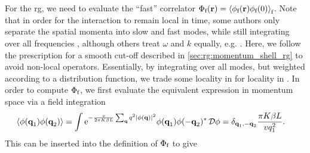 For the \tms{} \gls{rg}, we need to evaluate the ``fast'' correlator $\Phi_\f(\textbf{r}) = \bra*{\phi_\f(\textbf{r}) \phi_\f(0)}_\f$.
Note that in order for the interaction to remain local in time, some authors only separate the spatial momenta into slow and fast modes, while still integrating over all frequencies \cites[\ssec IV.B]{Bosonization_Shankar_1994}[\ssec III.A]{Bosonization_Schulz_1995}[]{Bosonization_Rao_2001}, although others treat $\omega$ and $k$ equally, e.g. \cite[\sapp E]{Giamarchi_2004}.
Here, we follow the prescription for a smooth cut-off described in \autoref{sec:rg:momentum_shell_rg} to avoid non-local operators.
Essentially, by integrating over all modes, but weighted according to a distribution function, we trade some locality in \tpspace{} for locality in \trspace{}.
In order to compute $\Phi_\f$, we first evaluate the equivalent expression in momentum space via a field integration \cite[\sapp C]{Giamarchi_2004}
\begin{align*}
\bra*{\phi(\textbf{q}_1)\phi(\textbf{q}_2)} &= \int \powe{-\frac{v}{2\pi K\beta L} \sum_\textbf{q} q^2 \abs*{\phi(\textbf{q})}^2} \phi(\textbf{q}_1) \phi(-\textbf{q}_2)^\ast \,\mathcal{D}\phi = \delta_{\textbf{q}_1,-\textbf{q}_2} \frac{\pi K\beta L}{v q_1^2}.
\end{align*}%
This can be inserted into the definition of $\Phi_\f$ to give%
